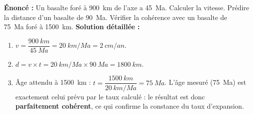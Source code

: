 \documentclass[11pt]{article}
\begin{document}
\begin{corrige}
\textbf{Énoncé :} Un basalte foré à \SI{900}{km} de l'axe a \SI{45}{Ma}. Calculer la vitesse. Prédire la distance d'un basalte de \SI{90}{Ma}. Vérifier la cohérence avec un basalte de \SI{75}{Ma} foré à \SI{1500}{km}.
\tcblower
\textbf{Solution détaillée :}
\begin{enumerate}
\item $v = \dfrac{\SI{900}{km}}{\SI{45}{Ma}} = \SI{20}{km/Ma} = \SI{2}{cm/an}$.
\item $d = v \times t = \SI{20}{km/Ma} \times \SI{90}{Ma} = \SI{1800}{km}$.
\item Âge attendu à \SI{1500}{km} : $t = \dfrac{\SI{1500}{km}}{\SI{20}{km/Ma}} = \SI{75}{Ma}$. L'âge mesuré (\SI{75}{Ma}) est exactement celui prévu par le taux calculé : le résultat est donc \textbf{parfaitement cohérent}, ce qui confirme la constance du taux d'expansion.
\end{enumerate}
\end{corrige}
\end{document}
